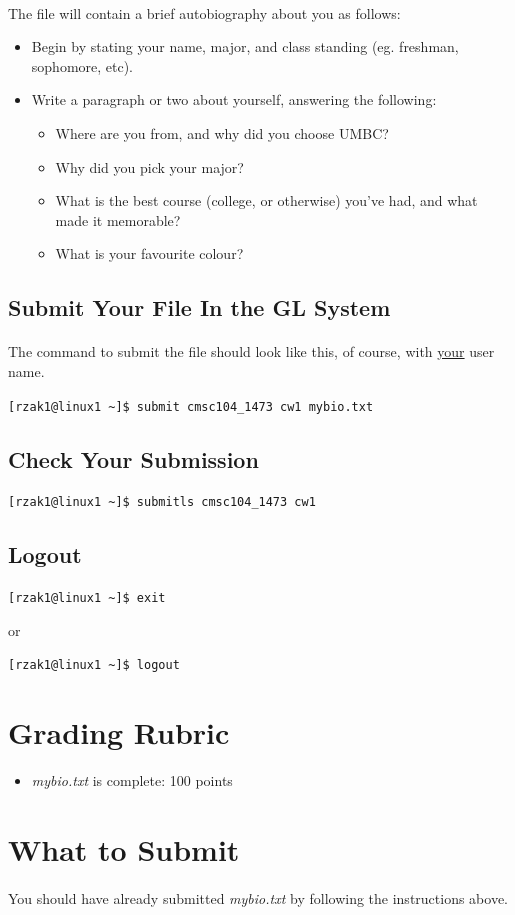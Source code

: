 \documentclass[letter,11pt]{article}
\begin{document}
\paragraph{}The file will contain a brief autobiography about you as follows:
\begin{itemize}
    \item Begin by stating your name, major, and class standing (eg. freshman, sophomore, etc).
    \item Write a paragraph or two about yourself, answering the following:
    \begin{itemize}
        \item Where are you from, and why did you choose UMBC?
        \item Why did you pick your major?
        \item What is the best course (college, or otherwise) you've had, and what made it memorable?
        \item What is your favourite colour?
    \end{itemize}
\end{itemize}

\subsection{Submit Your File In the GL System}
\paragraph{}The command to submit the file should look like this, of course, with \underline{your} user name.

\verb|[rzak1@linux1 ~]$ submit cmsc104_1473 cw1 mybio.txt|

\subsection{Check Your Submission}
\verb|[rzak1@linux1 ~]$ submitls cmsc104_1473 cw1|

\subsection{Logout}
\verb|[rzak1@linux1 ~]$ exit| 

or

\verb|[rzak1@linux1 ~]$ logout|

\section*{Grading Rubric}
\begin{itemize}
    \item \textit{mybio.txt} is complete: 100 points
\end{itemize}

\section*{What to Submit}
\paragraph{}You should have already submitted \textit{mybio.txt} by following the instructions above.
\end{document}
